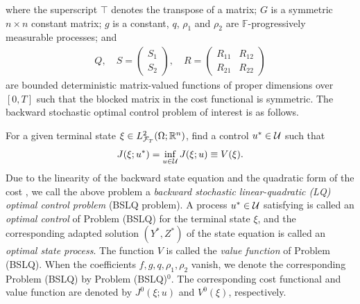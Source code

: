 \documentclass[11pt,times,twoside]{article}
\def\dbF{\mathbb{F}} \def\sF{\mathscr{F}} \def\fF{\mathfrak{F}} \def\cF{{\cal F}} \def\BF{{\bf F}} \def\Bf{{\bf f}}
\def\dbR{\mathbb{R}} \def\sR{\mathscr{R}} \def\fR{\mathfrak{R}} \def\cR{{\cal R}} \def\BR{{\bf R}} \def\Br{{\bf r}}
\def\Om{\Omega}      \def\Lm{\Lambda}     \def\Th{\Theta}
\def\ms{\medskip}         \def\da{\mathop{\downarrow}}       \def\rt{\right}
\def\no{\noindent}        \def\q{\quad}                      \def\llan{\left\langle}
\def\ts{\times}           \def\qq{\qquad}                    \def\rran{\right\rangle}
\begin{document}
%
where the superscript $\top$ denotes the transpose of a matrix; $G$ is a symmetric $n\ts n$ constant
matrix; $g$ is a constant, $q$, $\rho_1$ and $\rho_2$ are $\dbF$-progressively measurable processes; and
%
\begin{align*}
  Q,\quad S=\begin{pmatrix}S_1\\ S_2\end{pmatrix},\quad  R=\begin{pmatrix}R_{11}&R_{12}\\R_{21}&R_{22}\end{pmatrix}
\end{align*}
%
are bounded deterministic matrix-valued functions of proper dimensions over $[0, T]$ such
that the blocked matrix in the cost functional is symmetric.
The backward stochastic optimal control problem of interest is as follows.

\ms

\no{\bf Problem (BSLQ).} For a given terminal state $\xi\in L^2_{\cF_T}(\Om;\dbR^n)$, find a control $u^*\in{\cal U}$ such that
%
\begin{align}\label{Value}
  J(\xi;u^*)=\inf_{u\in{\cal U}}J(\xi;u)\equiv V(\xi).
\end{align}
%
Due to the linearity of the backward state equation  and the quadratic form of the cost ,
we call the above problem a {\it backward stochastic linear-quadratic (LQ) optimal control problem} (BSLQ problem).
A process $u^*\in{\cal U}$ satisfying  is called an {\it optimal control} of Problem (BSLQ) for the terminal state $\xi$,
and the corresponding adapted solution $(Y^*, Z^*)$ of the state equation  is called an {\it optimal state process}.
The function $V$ is called the {\it value function} of Problem (BSLQ).
When the coefficients $f,g,q,\rho_1,\rho_2$ vanish, we denote the corresponding Problem (BSLQ) by Problem (BSLQ)$^0$.
The corresponding cost functional and value function are denoted by $J^0(\xi;u)$ and $V^0(\xi)$, respectively.

\ms

\ms
\end{document}
